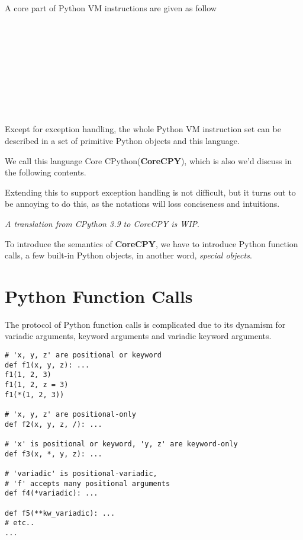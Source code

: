 \documentclass[12pt, a4paper]{report}
\begin{document}
A core part of Python VM instructions are given as follow

\begin{bnf*}
     \\
    \\    
    \\
    \\
    \\
    \\
    \\
     \\
\end{bnf*}


Except for exception handling, the whole Python VM instruction set can be described in
a set of primitive Python objects and this language.

We call this language Core CPython(\textbf{CoreCPY}), which is also we'd discuss in the following contents.

Extending this to support exception handling is not difficult,
but it turns out to be annoying to do this,
as the notations will loss conciseness and intuitions.

\textit{A translation from CPython 3.9 to CoreCPY is WIP}.

To introduce the semantics of \textbf{CoreCPY},
we have to introduce Python function calls,
a few built-in Python objects, in another word, \textit{special objects}.

\section* {Python Function Calls}

The protocol of Python function calls is complicated due to its dynamism for
variadic arguments, keyword arguments and variadic keyword arguments.

\begin{lstlisting}
# 'x, y, z' are positional or keyword
def f1(x, y, z): ...
f1(1, 2, 3)
f1(1, 2, z = 3)
f1(*(1, 2, 3))

# 'x, y, z' are positional-only
def f2(x, y, z, /): ...

# 'x' is positional or keyword, 'y, z' are keyword-only
def f3(x, *, y, z): ...

# 'variadic' is positional-variadic,
# 'f' accepts many positional arguments
def f4(*variadic): ...

def f5(**kw_variadic): ...
# etc..
... 
\end{lstlisting}
\end{document}
